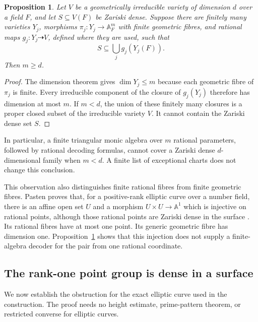 \documentclass[11pt]{article}
\newtheorem{proposition}[theorem]{Proposition}
\theoremstyle{definition}
\begin{document}
\begin{proposition}\label{prop:finite-algebra-dimension-obstruction}
Let $V$ be a geometrically irreducible variety of dimension $d$ over
a field $F$, and let $S\subseteq V(F)$ be Zariski dense.  Suppose
there are finitely many varieties $Y_j$, morphisms
$\pi_j:Y_j\longrightarrow\mathbb A_F^m$ with finite geometric
fibres, and rational maps $g_j:Y_j\dashrightarrow V$, defined
where they are used, such that
\[
                         S\subseteq\bigcup_jg_j(Y_j(F)).
\]
Then $m\ge d$.
\end{proposition}
\begin{proof}
The dimension theorem gives $\dim Y_j\le m$ because each
geometric fibre of $\pi_j$ is finite.  Every irreducible component
of the closure of $g_j(Y_j)$ therefore has dimension at most $m$.
If $m<d$, the union of these finitely many closures is a proper
closed subset of the irreducible variety $V$.  It cannot contain
the Zariski dense set $S$.
\end{proof}

In particular, a finite triangular monic algebra over $m$ rational
parameters, followed by rational decoding formulas, cannot cover
a Zariski dense $d$-dimensional family when $m<d$.  A finite list
of exceptional charts does not change this conclusion.

This observation also distinguishes finite rational fibres from
finite geometric fibres.  Pasten proves that, for a positive-rank
elliptic curve over a number field, there is an affine open set
$U$ and a morphism $U\times U\to\mathbb A^1$ which is injective
on rational points, although those rational points are Zariski
dense in the surface \cite[Corollary 1.2]{P3Pasten2020}.
Its rational fibres have at most one point.  Its generic geometric
fibre has dimension one.  Proposition~\ref{prop:finite-algebra-dimension-obstruction}
shows that this injection does not supply a finite-algebra decoder
for the pair from one rational coordinate.

\subsection{The rank-one point group is dense in a surface}

We now establish the obstruction for the exact elliptic curve
used in the construction.  The proof needs no height estimate,
prime-pattern theorem, or restricted converse for elliptic curves.
\end{document}
